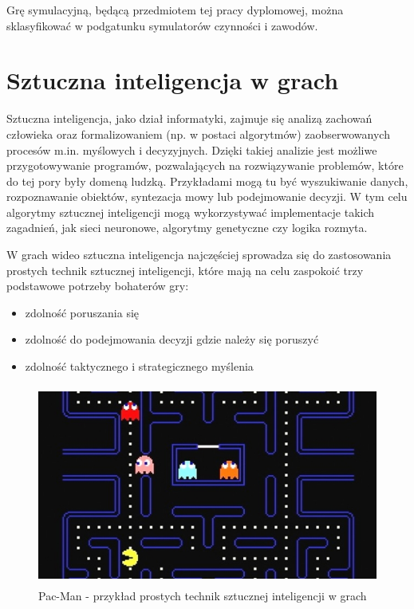 Grę symulacyjną, będącą przedmiotem tej pracy dyplomowej, można sklasyfikować w podgatunku symulatorów czynności i zawodów.

\section{Sztuczna inteligencja w grach}
Sztuczna inteligencja, jako dział informatyki, zajmuje się analizą zachowań człowieka oraz formalizowaniem (np. w postaci algorytmów) zaobserwowanych procesów m.in. myślowych i decyzyjnych. Dzięki takiej analizie jest możliwe przygotowywanie programów, pozwalających na rozwiązywanie problemów, które do tej pory były domeną ludzką. Przykładami mogą tu być wyszukiwanie danych, rozpoznawanie obiektów, syntezacja mowy lub podejmowanie decyzji. W tym celu algorytmy sztucznej inteligencji mogą wykorzystywać implementacje takich zagadnień, jak sieci neuronowe, algorytmy genetyczne czy logika rozmyta.

W grach wideo sztuczna inteligencja najczęściej sprowadza się do zastosowania prostych technik sztucznej inteligencji, które mają na celu zaspokoić trzy podstawowe potrzeby bohaterów gry\cite{aiForGames}:
\begin{itemize}
	\item zdolność poruszania się 
	\item zdolność do podejmowania decyzji gdzie należy się poruszyć
	\item zdolność taktycznego i strategicznego myślenia
\end{itemize}

\begin{figure}
\begin{center}
	\includegraphics[width=120mm,height=66mm]{images/pacman}
	\caption{Pac-Man - przykład prostych technik sztucznej inteligencji w grach\label{pacman}}
\end{center}
\end{figure}


